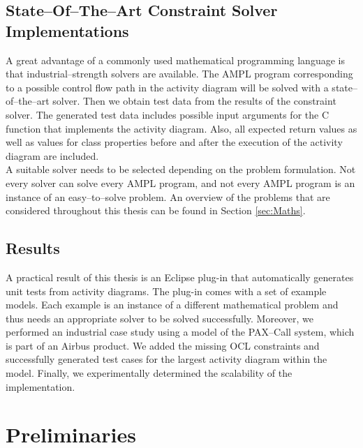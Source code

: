 \documentclass[runningheads,a4paper]{llncs}%
\begin{document}
\subsection{State--Of--The--Art Constraint Solver Implementations} 
A great advantage of a commonly used mathematical programming language is that industrial--strength solvers are available. The AMPL program corresponding to a possible control flow path in the activity diagram will be solved with a state--of--the--art solver. Then we obtain test data from the results of the constraint solver. The generated test data includes possible input arguments for the C function that implements the activity diagram. Also, all expected return values as well as values for class properties before and after the execution of the activity diagram are included.\\
A suitable solver needs to be selected depending on the problem formulation. Not every solver can solve every AMPL program, and not every AMPL program is an instance of an easy--to--solve problem. An overview of the problems that are considered throughout this thesis can be found in Section \ref{sec:Maths}.
\subsection{Results}
A practical result of this thesis is an Eclipse plug-in that automatically generates unit tests from activity diagrams. The plug-in comes with a set of example models. Each example is an instance of a different mathematical problem and thus needs an appropriate solver to be solved successfully. Moreover, we performed an industrial case study using a model of the PAX--Call system, which is part of an Airbus product. We added the missing OCL constraints and successfully generated test cases for the largest activity diagram within the model. Finally, we experimentally determined the scalability of the implementation.

\section{Preliminaries}%
\end{document}
